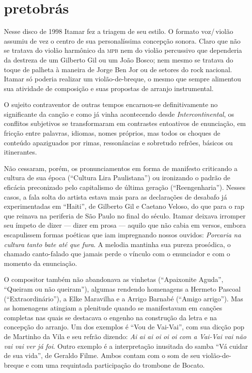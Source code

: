 \section{pretobrás}

Nesse disco de 1998 Itamar fez a triagem de seu estilo. O formato
voz/\,violão assumiu de vez o centro de sua personalíssima concepção
sonora. Claro que não se tratava do violão harmônico da \textsc{mpb} nem do
violão percussivo que dependeria da destreza de um Gilberto Gil ou um
João Bosco; nem mesmo se tratava do toque de palheta à maneira de Jorge
Ben Jor ou de setores do rock nacional. Itamar só poderia realizar um
violão-de-breque, o mesmo que sempre alimentou sua atividade de
composição e suas propostas de arranjo instrumental.

O sujeito contraventor de outras tempos encarnou-se definitivamente no
significante da canção e como já vinha acontecendo desde
\textit{Intercontinental}, os conflitos subjetivos se transformaram em contrastes
entoativos de enunciação, em fricção entre palavras, idiomas, nomes
próprios, mas todos os choques de conteúdo apaziguados por rimas,
ressonâncias e sobretudo refrões, básicos ou itinerantes.

Não cessaram, porém, os pronunciamentos em forma de manifesto criticando a cultura de sua época (``Cultura Lira Paulistana'') ou ironizando o
padrão de eficácia preconizado pelo capitalismo de última geração
(``Reengenharia''). Nesses casos, a fala solta do artista estava mais para
as declarações de desabafo já experimentadas em ``Haiti'', de Gilberto Gil e
Caetano Veloso, do que para o rap que reinava na periferia de São Paulo
no final do século. Itamar deixava irromper seu ímpeto de dizer ---
dizer em prosa --- aquilo que não cabia em versos, embora escapulissem
formas poéticas que iam impregnando nossos ouvidos: \textit{Porcaria na
cultura tanto bate até que fura}. A melodia mantinha sua pureza
prosódica, o chamado canto-falado que jamais perde o vínculo com o
enunciador e com o momento da enunciação.

O compositor também não abandonava as vinhetas (``Apaixonite Aguda'',
``Queiram ou não queiram''), algumas rendendo homenagens a Hermeto Pascoal
(``Extraordinário''), a Elke Maravilha e a Arrigo Barnabé (``Amigo arrigo'').
Mas as homenagens atingiam a plenitude quando se manifestavam em canções
completas nas quais se destacava o engenho na construção da letra e na
concepção do arranjo. Um dos exemplos é ``Vou de Vai-Vai'', com sua dicção
pop de Martinho da Vila e seu refrão dizendo: \textit{Ai ai ai oi oi oi com a
Vai-Vai vai não vai vai ver já foi}. Outro exemplo é a interpretação
inusitada do samba ``Vá cuidar de sua vida'', de Geraldo Filme. Ambos contam
com o som de seu violão-de-breque e com uma requintada participação do
trombone de Bocato.

